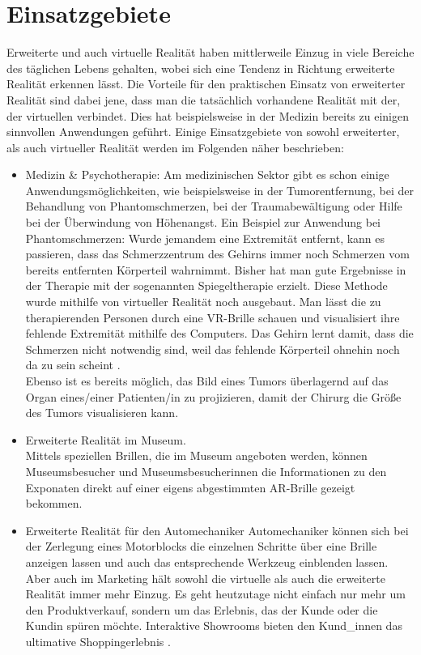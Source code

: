 \documentclass[deutsch]{llncs}
\begin{document}
\section{Einsatzgebiete}
Erweiterte und auch virtuelle Realität haben mittlerweile Einzug in viele Bereiche des täglichen Lebens gehalten, wobei sich eine Tendenz in Richtung erweiterte Realität erkennen lässt. Die Vorteile für den praktischen Einsatz von erweiterter Realität sind dabei jene, dass man die tatsächlich vorhandene Realität mit der, der virtuellen verbindet. Dies hat beispielsweise in der Medizin bereits zu einigen sinnvollen Anwendungen geführt. Einige Einsatzgebiete von sowohl erweiterter, als auch virtueller Realität werden im Folgenden näher beschrieben: 
\begin{itemize}
\item Medizin \& Psychotherapie:
Am medizinischen Sektor gibt es schon einige Anwendungsmöglichkeiten, wie beispielsweise in der Tumorentfernung, bei der Behandlung von Phantomschmerzen, bei der Traumabewältigung oder Hilfe bei der Überwindung von Höhenangst. 
Ein Beispiel zur Anwendung bei Phantomschmerzen: Wurde jemandem eine Extremität entfernt, kann es passieren, dass das Schmerzzentrum des Gehirns immer noch Schmerzen vom bereits entfernten Körperteil wahrnimmt. Bisher hat man gute Ergebnisse in der Therapie mit der sogenannten Spiegeltherapie erzielt. Diese Methode wurde mithilfe von virtueller Realität noch ausgebaut. Man lässt die zu therapierenden Personen durch eine VR-Brille schauen und visualisiert ihre fehlende Extremität mithilfe des Computers. Das Gehirn lernt damit, dass die Schmerzen nicht notwendig sind, weil das fehlende Körperteil ohnehin noch da zu sein scheint \cite{}. \\
Ebenso ist es bereits möglich, das Bild eines Tumors überlagernd auf das Organ eines/einer Patienten/in zu projizieren, damit der Chirurg die Größe des Tumors visualisieren kann.
\item Erweiterte Realität im Museum. \\
Mittels speziellen Brillen, die im Museum angeboten werden, können Museumsbesucher und Museumsbesucherinnen die Informationen zu den Exponaten direkt auf einer eigens abgestimmten AR-Brille gezeigt bekommen. 
\item Erweiterte Realität für den Automechaniker
Automechaniker können sich bei der Zerlegung eines Motorblocks die einzelnen Schritte über eine Brille anzeigen lassen und auch das entsprechende Werkzeug einblenden lassen. \\
Aber auch im Marketing hält sowohl die virtuelle als auch die erweiterte Realität immer mehr Einzug. Es geht heutzutage nicht einfach nur mehr um den Produktverkauf, sondern um das Erlebnis, das der Kunde oder die Kundin spüren möchte. Interaktive Showrooms bieten den Kund\_innen das ultimative Shoppingerlebnis \cite{}.


\end{itemize}
\end{document}
